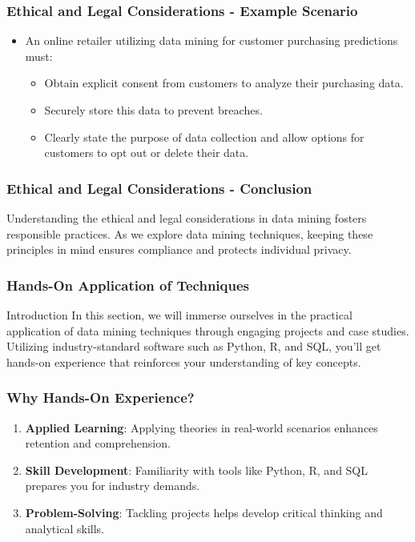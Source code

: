 \documentclass{beamer}
\begin{document}
\begin{frame}[fragile]
    \frametitle{Ethical and Legal Considerations - Example Scenario}
    \begin{itemize}
        \item An online retailer utilizing data mining for customer purchasing predictions must:
        \begin{itemize}
            \item Obtain explicit consent from customers to analyze their purchasing data.
            \item Securely store this data to prevent breaches.
            \item Clearly state the purpose of data collection and allow options for customers to opt out or delete their data.
        \end{itemize}
    \end{itemize}
\end{frame}

\begin{frame}[fragile]
    \frametitle{Ethical and Legal Considerations - Conclusion}
    Understanding the ethical and legal considerations in data mining fosters responsible practices. As we explore data mining techniques, keeping these principles in mind ensures compliance and protects individual privacy.
\end{frame}

\begin{frame}[fragile]
    \frametitle{Hands-On Application of Techniques}
    \begin{block}{Introduction}
        In this section, we will immerse ourselves in the practical application of data mining techniques through engaging projects and case studies. Utilizing industry-standard software such as Python, R, and SQL, you'll get hands-on experience that reinforces your understanding of key concepts.
    \end{block}
\end{frame}

\begin{frame}[fragile]
    \frametitle{Why Hands-On Experience?}
    \begin{enumerate}
        \item \textbf{Applied Learning}: Applying theories in real-world scenarios enhances retention and comprehension.
        \item \textbf{Skill Development}: Familiarity with tools like Python, R, and SQL prepares you for industry demands.
        \item \textbf{Problem-Solving}: Tackling projects helps develop critical thinking and analytical skills.
    \end{enumerate}
\end{frame}
\end{document}
